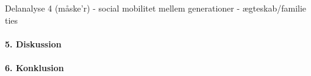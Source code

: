 	Delanalyse 4 (måske'r)
		- social mobilitet mellem generationer
		- ægteskab/familie ties


\paragraph{5. Diskussion}




\paragraph{6. Konklusion}




















